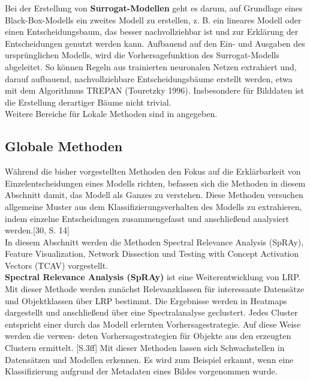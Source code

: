 \documentclass[11pt,a4paper]{article}
\numberwithin{equation}{section}
\begin{document}
	Bei der Erstellung von \textbf{Surrogat-Modellen} geht es darum, auf Grundlage eines Black-Box-Modells ein zweites Modell zu erstellen, z. B. ein lineares Modell oder einen Entscheidungsbaum, das besser nachvollziehbar ist und zur Erklärung der Entscheidungen genutzt werden kann. Aufbauend auf den Ein- und Ausgaben des ursprünglichen Modells, wird die Vorhersagefunktion des Surrogat-Modells abgeleitet. So können Regeln aus trainierten 
	neuronalen Netzen extrahiert und, darauf aufbauend, nachvollziehbare Entscheidungsbäume erstellt werden, etwa mit dem Algorithmus TREPAN (Touretzky 1996). Insbesondere für Bilddaten ist die Erstellung derartiger Bäume nicht trivial.\\
	
	Weitere Bereiche für Lokale Methoden sind in \cite{kistudie} angegeben.
	

	
	\subsection{Globale Methoden}
	
	Während die bisher vorgestellten Methoden den Fokus auf die Erklärbarkeit von Einzelentscheidungen eines Modells richten, befassen sich die Methoden in diesem
	Abschnitt damit, das Modell als Ganzes zu verstehen. Diese Methoden versuchen allgemeine
	Muster aus dem Klassifizierungsverhalten des Modells zu extrahieren, indem einzelne Entscheidungen zusammengefasst und anschließend analysiert werden.[30, S. 14]\\
	In diesem Abschnitt werden die Methoden Spectral Relevance Analysis (SpRAy),
	Feature Visualization, Network Dissection und Testing with Concept Activation
	Vectors (TCAV) vorgestellt.\\
	
	\noindent \textbf{Spectral Relevance Analysis (SpRAy)} ist eine Weiterentwicklung von LRP. Mit
	dieser Methode werden zunächst Relevanzklassen für interessante Datensätze und
	Objektklassen über LRP bestimmt. Die Ergebnisse werden in Heatmaps dargestellt
	und anschließend über eine Spectralanalyse geclustert. Jedes Cluster entspricht einer
	durch das Modell erlernten Vorhersagestrategie. Auf diese Weise werden die verwen-
	deten Vorhersagestrategien für Objekte aus den erzeugten Clustern ermittelt. \cite{unmaskingCH}[S.3ff] Mit dieser Methoden lassen sich Schwachstellen in Datensätzen und Modellen erkennen. Es wird zum Beispiel erkannt, wenn eine Klassifizierung aufgrund der
	Metadaten eines Bildes vorgenommen wurde.\\
	
\end{document}
